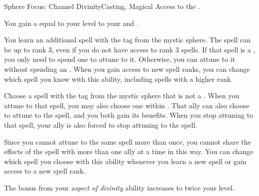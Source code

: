     \begin{magicalfeat}{Sphere Focus: Channel Divinity}{Casting, Magical}
        \featpre Access to the  .

         You gain a  equal to your level to your  and .

         You learn an additional spell with the  tag from the  mystic sphere.
        The spell can be up to rank 3, even if you do not have access to rank 3 spells.
        If that spell is a , you only need to spend one  to attune to it.
        Otherwise, you can attune to it without spending an .
        When you gain access to new spell ranks, you can change which spell you know with this ability, including spells with a higher rank.

         Choose a spell with the  tag from the  mystic sphere that is not a .
        When you attune to that spell, you may also choose one  within \medrange.
        That ally can also choose to attune to the spell, and you both gain its benefits.
        When you stop attuning to that spell, your ally is also forced to stop attuning to the spell.

        Since you cannot attune to the same spell more than once, you cannot share the effects of the spell with more than one ally at a time in this way.
        You can change which spell you choose with this ability whenever you learn a new spell or gain access to a new spell rank.

         The bonus from your \textit{aspect of divinity} ability increases to twice your level.
    \end{magicalfeat}

